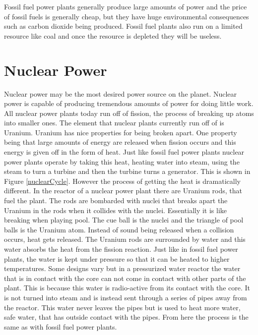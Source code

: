 \documentclass[msc,oneside]{ubcthesis}%
\begin{document}
Fossil fuel power plants generally produce large amounts of power and the price of fossil fuels is generally cheap, but they have huge environmental consequences such as carbon dioxide being produced. Fossil fuel plants also run on a limited resource like coal and once the resource is depleted they will be useless.
\newpage
 \section{Nuclear Power}

 Nuclear power may be the most desired power source on the planet. Nuclear power is capable of producing tremendous amounts of power for doing little work. All nuclear power plants today run off of fission, the process of breaking up atoms into smaller ones. The element that nuclear plants currently run off of is Uranium. Uranium has nice properties for being broken apart. One property being that large amounts of energy are released when fission occurs and this energy is given off in the form of heat. Just like fossil fuel 
 power plants nuclear power plants operate by taking this heat, heating water into steam, using the steam 
 to turn a turbine and then the turbine turns a generator. This is shown in Figure \ref{nuclearCycle}.
However the process of getting the heat is dramatically different. In the reactor of a nuclear power 
plant there are Uranium rods, that fuel the plant. The rods are bombarded with nuclei that breaks apart the 
Uranium in the rods when it collides with the nuclei. Essentially it is like breaking when playing pool. The cue ball is the nuclei and 
the triangle of pool balls is the Uranium atom. Instead of sound being released when a collision occurs, 
heat gets released. The Uranium rods are surrounded by water and this water absorbs the heat from the 
fission reaction. Just like in fossil fuel power plants, the water is kept under pressure so that it can be 
heated to higher temperatures. Some designs vary but in a pressurized water reactor the water that is in contact with the core can not come in contact with other parts of the plant. This is because this water is radio-active from its contact with the core. It is not 
turned into steam and is instead sent through a series of pipes away from the reactor. This water never 
leaves the pipes but is used to heat more water, safe water, that has outside contact with the pipes. From 
here the process is the same as with fossil fuel power plants.
\end{document}

